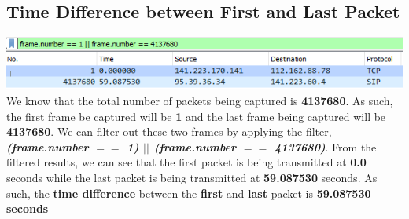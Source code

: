 \documentclass[a4paper,11pt]{article}
\begin{document}
\subsection{Time Difference between First and Last Packet }
\includegraphics{TimeDiff}
\newline
\newline
We know that the total number of packets being captured is \textbf{4137680}. As such, the first frame be captured will be \textbf{1} and the last frame being captured will be \textbf{4137680}. We can filter out these two frames by applying the filter, \textit{\textbf{(frame.number $==$ 1) $||$ (frame.number $==$ 4137680)}}. From the filtered results, we can see that the first packet is being transmitted at \textbf{0.0} seconds while the last packet is being transmitted at \textbf{59.087530} seconds. As such, the \textbf{time difference} between the \textbf{first} and \textbf{last} packet is \textbf{59.087530 seconds}
\end{document}
